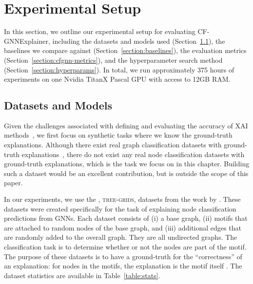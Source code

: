 
\section{Experimental Setup}
\label{section:cfgnn-experimental-setup}

In this section, we outline our experimental setup for evaluating CF-GNNExplainer, including the datasets and models used (Section~\ref{section:cfgnn-datasets}), the baselines we compare against (Section~\ref{section:baselines}), the evaluation metrics (Section~\ref{section:cfgnn-metrics}), and the hyperparameter search method (Section~\ref{section:hyperparams}). 
In total, we run approximately 375 hours of experiments on one Nvidia TitanX Pascal GPU with access to 12GB RAM. 


\subsection{Datasets and Models}
\label{section:cfgnn-datasets}
Given the challenges associated with defining and evaluating the accuracy of XAI methods~\citep{doshi-2017-towards}, we first focus on synthetic tasks where we know the ground-truth explanations. 
Although there exist real graph classification datasets with ground-truth explanations~\citep{mutag_dataset}, there do not exist any real node classification datasets with ground-truth explanations, which is the task we focus on in this chapter. 
Building such a dataset would be an excellent contribution, but is outside the scope of this paper.

In our experiments, we use the \synfour{}, \textsc{tree-grids}, \synone{} datasets from the work by \citet{ying_gnnexplainer_2019}. 
These datasets were created specifically for the task of explaining node classification predictions from GNNs. 
Each dataset consists of (i) a base graph, (ii) motifs that are attached to random nodes of the base graph, and (iii) additional edges that are randomly added to the overall graph. 
They are all undirected graphs. 
The classification task is to determine whether or not the nodes are part of the motif. 
The purpose of these datasets is to have a ground-truth for the ``correctness'' of an explanation: for nodes in the motifs, the explanation is the motif itself \citep{luo_parameterized_2020}. 
The dataset statistics are available in Table~\ref{table:stats}. 





